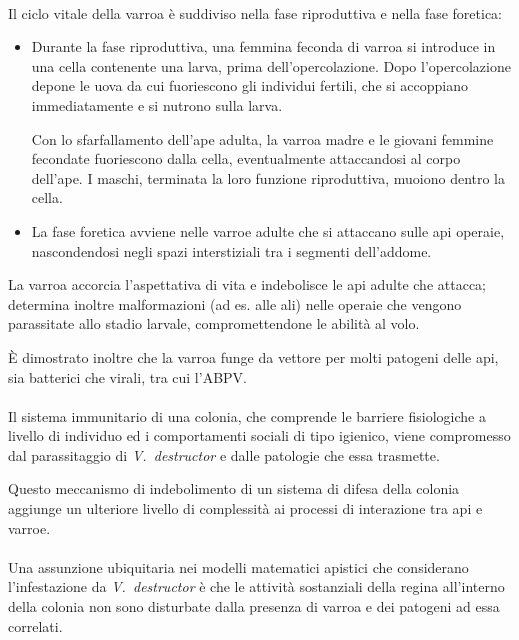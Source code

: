 \paragraph{}
Il ciclo vitale della varroa è suddiviso nella fase riproduttiva e nella fase foretica:
\begin{itemize}
    \item Durante la fase riproduttiva, una femmina feconda di varroa si introduce in una cella contenente una larva, prima dell'opercolazione. Dopo l'opercolazione depone le uova da cui fuoriescono gli individui fertili, che si accoppiano immediatamente e si nutrono sulla larva.

    Con lo sfarfallamento dell'ape adulta, la varroa madre e le giovani femmine fecondate fuoriescono dalla cella, eventualmente attaccandosi al corpo dell'ape.
    I maschi, terminata la loro funzione riproduttiva, muoiono dentro la cella.
    \item La fase foretica avviene nelle varroe adulte che si attaccano sulle api operaie, nascondendosi negli spazi interstiziali tra i segmenti dell'addome.
\end{itemize}

La varroa accorcia l'aspettativa di vita e indebolisce le api adulte che attacca; determina inoltre malformazioni (ad es. alle ali) nelle operaie che vengono parassitate allo stadio larvale, compromettendone le abilità al volo.

È dimostrato inoltre che la varroa funge da vettore per molti patogeni delle api, sia batterici che virali, tra cui l'ABPV.

\paragraph{}
Il sistema immunitario di una colonia, che comprende le barriere fisiologiche a livello di individuo ed i comportamenti sociali di tipo igienico, viene compromesso dal parassitaggio di \emph{V.~destructor} e dalle patologie che essa trasmette.

Questo meccanismo di indebolimento di un sistema di difesa della colonia aggiunge un ulteriore livello di complessità ai processi di interazione tra api e varroe.

\paragraph{}
Una assunzione ubiquitaria nei modelli matematici apistici che considerano l'infestazione da \emph{V.~destructor} è
che le attività sostanziali della regina all'interno della colonia non sono disturbate dalla presenza di varroa e dei patogeni ad essa correlati.

